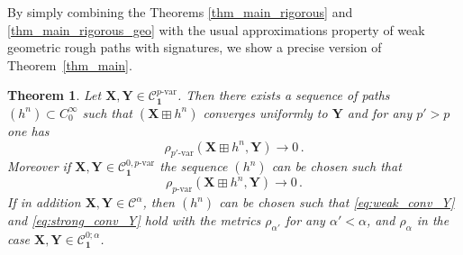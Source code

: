 \documentclass[12pt,a4paper]{article}
\numberwithin{equation}{section}
\theoremstyle{plain}
\newtheorem{theorem}{Theorem}[section]
\theoremstyle{definition}
\theoremstyle{remark}
\begin{document}
By simply combining the  Theorems \ref{thm_main_rigorous} and \ref{thm_main_rigorous_geo} with the usual approximations property of weak geometric rough paths with signatures, we show a precise version of Theorem~\ref{thm_main}. 

\begin{theorem}\label{thm_main_result}
Let $\mathbf{X}, \mathbf{Y} \in \mathcal{C}^{p\text{-var}}_{\mathbf{1}}$. Then there exists  a sequence of paths $(h^n)\subset  C^{\infty}_0$ such that $(\mathbf X\boxplus h^n)$ converges uniformly to $\mathbf{Y}$ and for any $p'>p$ one has
	 \begin{equation}\label{eq:weak_conv_Y}
\rho_{p'\text{-var}}(\mathbf X\boxplus h^n,\mathbf{Y} )\to 0 \,.
	\end{equation}
	Moreover if $\mathbf{X}, \mathbf{Y}\in \mathcal{C}^{0,p\text{-var}}_{\mathbf{1}}$ the sequence $(h^n) $ can be chosen  such that
	 \begin{equation}\label{eq:strong_conv_Y}
\rho_{p\text{-var}}(\mathbf{X} \boxplus h^n, \mathbf{Y}) \to 0\,.
\end{equation}
If in addition $\mathbf{X}, \mathbf{Y} \in \mathcal{C}^{\alpha}$, then $(h^n)$ can be chosen such that \eqref{eq:weak_conv_Y} and \eqref{eq:strong_conv_Y} hold with the metrics $\rho_{\alpha'}$ for any $\alpha'<\alpha$, and $\rho_{\alpha}$ in the case $\mathbf{X}, \mathbf{Y} \in \mathcal{C}^{0;\alpha}_{\mathbf{1}}$.
\end{theorem}
\end{document}
